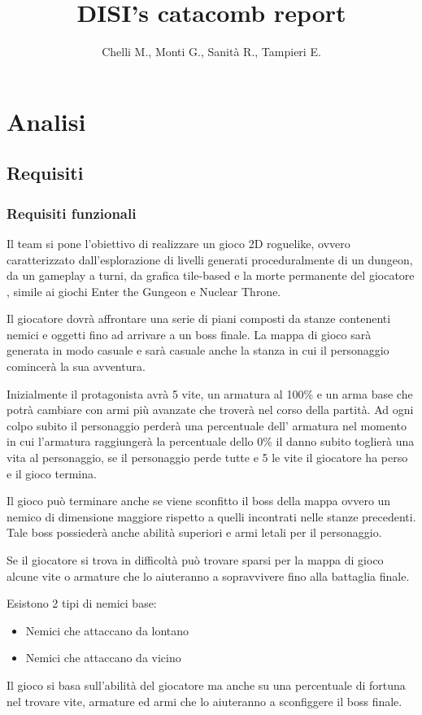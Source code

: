 \documentclass[a4paper,12pt]{report}
\title{DISI's catacomb report}
\author{Chelli M., Monti G., Sanità R., Tampieri E.}
\begin{document}
	\maketitle
	\tableofcontents
	\chapter{Analisi}
	\section{Requisiti}
	\subsection{Requisiti funzionali}
	\par Il team si pone l'obiettivo di realizzare un gioco 2D roguelike,
	ovvero caratterizzato dall'esplorazione di livelli generati proceduralmente
	di un dungeon, da un gameplay a turni, da grafica tile-based e la morte
	permanente del giocatore \cite{wiki:Roguelike}, simile ai giochi Enter the
	Gungeon e Nuclear Throne.
	\par Il giocatore dovrà affrontare una serie di piani composti da stanze contenenti
	nemici e oggetti fino ad arrivare a un boss finale. La mappa di gioco sarà generata
	in modo casuale e sarà casuale anche la stanza in cui il personaggio comincerà
	la sua avventura.
	\par Inizialmente il protagonista avrà 5 vite, un armatura al 100\%
	e un arma base che potrà cambiare con armi più avanzate che troverà nel corso
	della partità. Ad ogni colpo subito il personaggio perderà una percentuale dell'
	armatura nel momento in cui l'armatura raggiungerà la percentuale dello 0\%
	il danno subito toglierà una vita al personaggio, se il personaggio perde tutte
	e 5 le vite il giocatore ha perso e il gioco termina.
	\par Il gioco può terminare anche se viene sconfitto il boss della mappa ovvero
	un nemico di dimensione maggiore rispetto a quelli incontrati nelle stanze precedenti.
	Tale boss possiederà anche abilità superiori e armi letali per il personaggio.
	\par Se il giocatore si trova in difficoltà può trovare sparsi per la mappa di gioco
	alcune vite o armature che lo aiuteranno a sopravvivere fino alla battaglia finale.
	\par Esistono 2 tipi di nemici base:
	\begin{itemize}
		\item Nemici che attaccano da lontano
		\item Nemici che attaccano da vicino
	\end{itemize}
	\par Il gioco si basa sull'abilità del giocatore ma anche su una percentuale di
	fortuna nel trovare vite, armature ed armi che lo aiuteranno a sconfiggere il
	boss finale.
\end{document}
